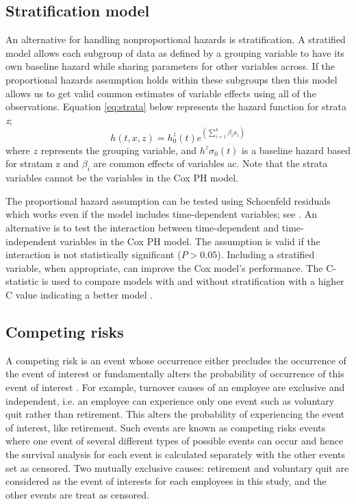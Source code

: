 \documentclass[12pt,letterpaper]{article}
\begin{document}
\subsection{Stratification model}
An alternative for handling nonproportional hazards is stratification.  A stratified model allows each subgroup of data as defined by a grouping variable to have its own baseline hazard while sharing parameters for other variables across. If the proportional hazards assumption holds within these subgroups then this model allows us to get valid common estimates of variable effects using all of the observations. Equation \ref{eq:strata} below represents the hazard function for strata {\it z};
\begin{equation}
	\label{eq:strata}
	h(t,x,z)=h^z_0(t)e^{(\sum_{i=1}^{k}\beta_ix_i)}
\end{equation}
where $z$ represents the grouping variable, and $h^z\sigma_0(t)$ is a baseline hazard based for stratam z and $\beta_i$ are common effects of variables ac. Note that the strata variables cannot be the variables in the Cox PH model.

The proportional hazard assumption can be tested using Schoenfeld residuals which works even if the model includes time-dependent variables; see \citet{allison2010,collett2015}. An alternative is to test the interaction between time-dependent and time-independent variables in the Cox PH model. The assumption is valid if the interaction is not statistically significant ($P>0.05$).  Including a stratified variable, when appropriate, can improve the Cox model's performance.  The C-statistic is used to compare models with and without stratification with a higher C value indicating a better model \citep{lemke2012}.

\subsection{Competing risks}
  A competing risk is an event whose occurrence either precludes the occurrence of the event of interest or fundamentally alters the probability of occurrence of this event of interest \citep{tableman2003}. For example, turnover causes of an employee are exclusive and independent, i.e. an employee can experience only one event such as voluntary quit rather than retirement. This alters the probability of experiencing the event of interest, like retirement. Such events are known as competing risks events where one event of several different types of possible events can occur and hence the survival analysis for each event is calculated separately with the other events set as censored. Two mutually exclusive causes: retirement and voluntary quit are considered as the event of interests for each employees in this study, and the other events are treat as censored.
\end{document}
